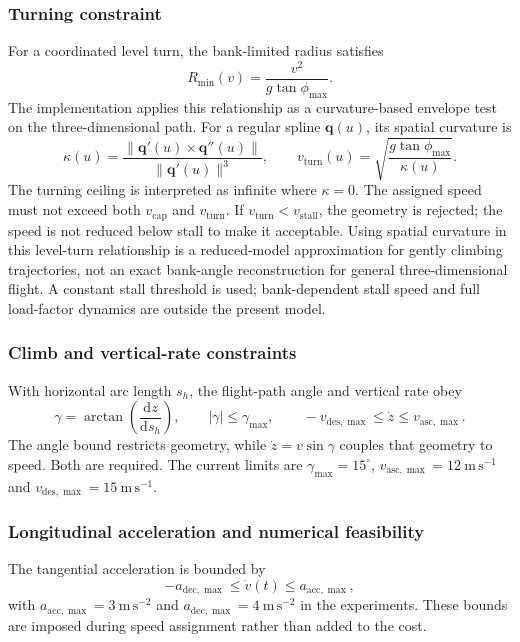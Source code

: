 \subsubsection{Turning constraint}
For a coordinated level turn, the bank-limited radius satisfies
\begin{equation}
 R_{\min}(v)=\frac{v^2}{g\tan\phi_{\max}}.
 \label{pr:eq:turnradius}
\end{equation}
The implementation applies this relationship as a curvature-based envelope
test on the three-dimensional path. For a regular spline
$\mathbf{q}(u)$, its spatial curvature is
\begin{equation}
 \kappa(u)=\frac{\|\mathbf{q}'(u)\times\mathbf{q}''(u)\|}
                    {\|\mathbf{q}'(u)\|^3},\qquad
 v_{\mathrm{turn}}(u)=\sqrt{\frac{g\tan\phi_{\max}}{\kappa(u)}}.
 \label{pr:eq:curvature}
\end{equation}
The turning ceiling is interpreted as infinite where $\kappa=0$.
The assigned speed must not exceed both $v_{\mathrm{cap}}$ and
$v_{\mathrm{turn}}$. If $v_{\mathrm{turn}}<v_{\mathrm{stall}}$, the geometry
is rejected; the speed is not reduced below stall to make it acceptable.
Using spatial curvature in this level-turn relationship is a reduced-model
approximation for gently climbing trajectories, not an exact bank-angle
reconstruction for general three-dimensional flight. A constant stall
threshold is used; bank-dependent stall speed and full load-factor dynamics
are outside the present model.

\subsubsection{Climb and vertical-rate constraints}
With horizontal arc length $s_h$, the flight-path angle and vertical rate obey
\begin{equation}
 \gamma=\arctan\left(\frac{\mathrm{d}z}{\mathrm{d}s_h}\right),\qquad
 |\gamma|\le\gamma_{\max},\qquad
 -v_{\mathrm{des},\max}\le\dot z\le v_{\mathrm{asc},\max}.
 \label{pr:eq:vertical}
\end{equation}
The angle bound restricts geometry, while $\dot z=v\sin\gamma$ couples
that geometry to speed. Both are required. The current limits are
$\gamma_{\max}=15^\circ$, $v_{\mathrm{asc},\max}=12~\mathrm{m\,s^{-1}}$
and $v_{\mathrm{des},\max}=15~\mathrm{m\,s^{-1}}$.

\subsubsection{Longitudinal acceleration and numerical feasibility}
The tangential acceleration is bounded by
\begin{equation}
 -a_{\mathrm{dec},\max}\le\dot v(t)\le a_{\mathrm{acc},\max},
 \label{pr:eq:acceleration}
\end{equation}
with $a_{\mathrm{acc},\max}=3~\mathrm{m\,s^{-2}}$ and
$a_{\mathrm{dec},\max}=4~\mathrm{m\,s^{-2}}$ in the experiments.
These bounds are imposed during speed assignment rather than added to the cost.


